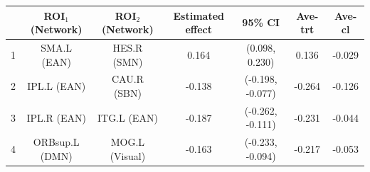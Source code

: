 \documentclass[12pt]{article}
\theoremstyle{definition}
\begin{document}
\begin{table}[t]
\begin{center}
\begin{tabular}{ccccccc}
\hline\hline
 & ROI$_1$ (Network) & ROI$_2$ (Network) & Estimated effect & 95\% CI & Ave-trt & Ave-cl  \\ \hline
1 & SMA.L (EAN) & HES.R (SMN) & 0.164 & (0.098, 0.230) & 0.136 & -0.029 \\
2 & IPL.L (EAN) & CAU.R (SBN) & -0.138 & (-0.198, -0.077) & -0.264 & -0.126 \\
3 & IPL.R (EAN) & ITG.L (EAN) & -0.187 & (-0.262, -0.111) & -0.231 & -0.044 \\
4 & ORBsup.L (DMN) & MOG.L (Visual) & -0.163 & (-0.233, -0.094) & -0.217 & -0.053 \\ 
\hline\hline
\end{tabular}		
\end{center}
\end{table}

	
\end{document}
